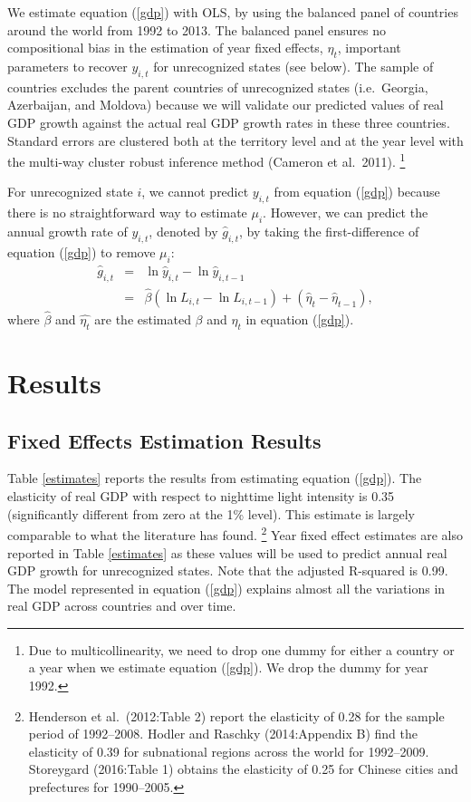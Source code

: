 \documentclass[12pt,a4paper]{article}%
\begin{document}
We estimate equation (\ref{gdp}) with OLS, by using the balanced panel of countries around the world from 1992 to 2013. The balanced panel ensures no compositional bias in the estimation of year fixed effects, $\eta_t$, important parameters to recover $y_{i,t}$ for unrecognized states (see below). 
The sample of countries excludes the parent countries of unrecognized states (i.e.\ Georgia, Azerbaijan, and Moldova) because we will validate our predicted values of real GDP growth against the actual real GDP growth rates in these three countries.
Standard errors are clustered both at the territory level and at the year level with the multi-way cluster robust inference method (Cameron et al.\ 2011).%
\footnote{Due to multicollinearity, we need to drop one dummy for either a country or a year when we estimate equation (\ref{gdp}). We drop the dummy for year 1992.}

For unrecognized state $i$, we cannot predict $y_{i,t}$ from equation (\ref{gdp}) because there is no straightforward way to estimate $\mu_i$. However, we can predict the annual growth rate of $y_{i,t}$, denoted by $\hat{g}_{i,t}$, by taking the first-difference of equation (\ref{gdp}) to remove $\mu_i$:
\begin{eqnarray}\label{growth}
\hat{g}_{i,t} 
&=& \ln \hat{y}_{i,t} - \ln \hat{y}_{i, t-1} \nonumber \\
&=& \hat{\beta} (\ln L_{i,t} - \ln L_{i,t-1}) + (\hat{\eta}_t - \hat{\eta}_{t-1}),
\end{eqnarray}
where $\hat{\beta}$ and $\hat{\eta_t}$ are the estimated $\beta$ and $\eta_t$ in equation (\ref{gdp}).

\section{Results}\label{results}
\subsection{Fixed Effects Estimation Results}
Table \ref{estimates} reports the results from estimating equation (\ref{gdp}). 
The elasticity of real GDP with respect to nighttime light intensity is 0.35 (significantly different from zero at the 1\% level).
This estimate is largely comparable to what the literature has found.%
\footnote{
	Henderson et al.\ (2012:Table 2) report the elasticity of 0.28 for the sample period of 1992--2008. Hodler and Raschky (2014:Appendix B) find the elasticity of 0.39 for subnational regions across the world for 1992--2009. Storeygard (2016:Table 1) obtains the elasticity of 0.25 for Chinese cities and prefectures for 1990--2005. 
}   
Year fixed effect estimates are also reported in Table \ref{estimates} as these values will be used to predict annual real GDP growth for unrecognized states. 
Note that the adjusted R-squared is 0.99. 
The model represented in equation (\ref{gdp}) explains almost all the variations in real GDP across countries and over time. 
\end{document}
